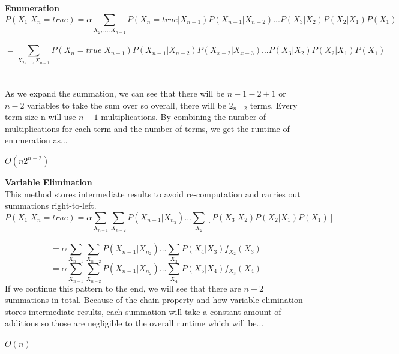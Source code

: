 \documentclass{article}
\begin{document}
\\\\    
\textbf{Enumeration}\\
$$P(X_1|X_n=true)= \alpha \sum_{X_2,...,X_{n-1}} P(X_n = true|X_{n-1})P(X_{n-1}|X_{n-2})...P(X_3|X_2)P(X_2|X_1)P(X_1)$$\\
$$=\sum_{X_2,...,X_{n-1}} P(X_n = true|X_{n-1})P(X_{n-1}|X_{n-2})P(X_{x-2}|X_{x-3})...P(X_3|X_2)P(X_2|X_1)P(X_1)$$ \\\\
As we expand the summation, we can see that there will be $n-1-2+1$ or $n-2$ variables to take the sum over so overall, there will be $2_{n-2}$ terms. Every term size n will use $n-1$ multiplications. By combining the number of multiplications for each term and the number of terms, we get the runtime of enumeration as...
\begin{center}
$O(n2^{n-2})$
\end{center}
\textbf{Variable Elimination}\\
This method stores intermediate results to avoid re-computation and carries out summations right-to-left.\\
$$P(X_1|X_n=true)= \alpha \sum_{X_{n-1}} \sum_{X_{n-2}} P(X_{n-1}|X_{n_2})... \sum_{X_2} [P(X_3|X_2)P(X_2|X_1)P(X_1)]$$\\
$$= \alpha \sum_{X_{n-1}} \sum_{X_{n-2}} P(X_{n-1}|X_{n_2})... \sum_{X_3} P(X_4|X_3)f_{X_2}(X_3)$$
$$= \alpha \sum_{X_{n-1}} \sum_{X_{n-2}} P(X_{n-1}|X_{n_2})... \sum_{X_4} P(X_5|X_4)f_{X_3}(X_4)$$
If we continue this pattern to the end, we will see that there are $n-2$ summations in total. Because of the chain property and how variable elimination stores intermediate results, each summation will take a constant amount of additions so those are negligible to the overall runtime which will be...
\begin{center}
    $O(n)$
\end{center}

\newpage
\end{document}
